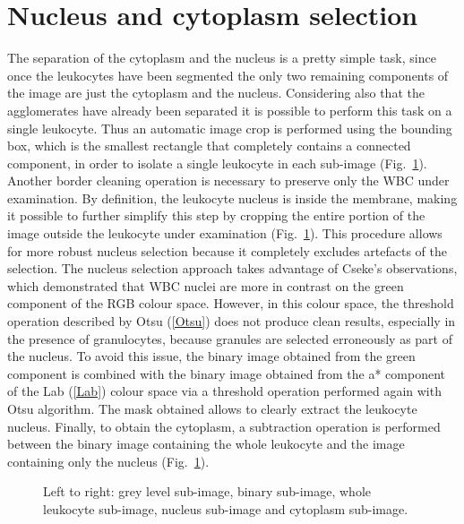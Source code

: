 \documentclass[final,a4paper,12pt,english]{UnicaPhdThesis3}
\begin{document}
	\section{Nucleus and cytoplasm selection}
	The separation of the cytoplasm and the nucleus is a pretty simple task, since once the leukocytes have been segmented the only two remaining components of the image are just the cytoplasm and the nucleus. Considering also that the agglomerates have already been separated it is possible to perform this task on a single leukocyte. Thus an automatic image crop is performed using the bounding box, which is the smallest rectangle that completely contains a connected component, in order to isolate a single leukocyte in each sub-image (Fig.~\ref{fig:example14}). Another border cleaning operation  is necessary to preserve only the WBC under examination. By definition,  the leukocyte nucleus is inside the  membrane,  making it possible to further simplify this step by cropping the entire portion  of the image outside the leukocyte under examination (Fig.~\ref{fig:example14}). This procedure allows for more robust nucleus selection because it completely excludes artefacts of the selection. The nucleus selection approach takes advantage  of Cseke's \cite{Cseke} observations, which demonstrated that WBC nuclei are more in contrast on the green component of the RGB colour space. However, in this colour space, the threshold operation described by Otsu (\ref{Otsu}) does not produce clean results, especially in the presence of granulocytes, because granules are selected erroneously as part  of the  nucleus. To avoid this issue, the binary image obtained from the green component is combined with the binary image obtained from the a* component of the Lab (\ref{Lab}) colour space via a threshold operation performed again with Otsu algorithm. The mask obtained allows to clearly extract the leukocyte nucleus. Finally, to obtain the cytoplasm, a subtraction operation is performed between the binary image containing  the whole leukocyte and the image containing only the nucleus (Fig.~\ref{fig:example14}).
	
	\begin{figure}[!htbp]
		\centering
		\caption{\label{fig:example14}Left to right: grey level sub-image, binary sub-image, whole leukocyte sub-image, nucleus sub-image and cytoplasm sub-image.}
	\end{figure}
	
\end{document}
